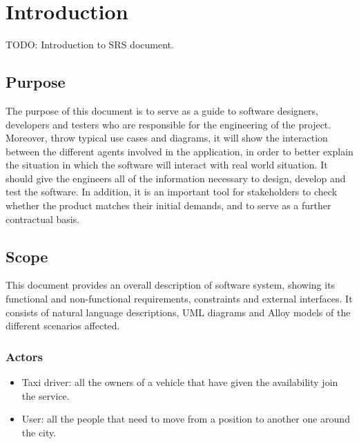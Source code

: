 \section{Introduction}      %
TODO: Introduction to \myTaxiService{} SRS document.
\subsection{Purpose}
The purpose of this document is to serve as a guide to software designers, developers and testers who are responsible for the engineering of the \myTaxiService{} project. Moreover, throw typical use cases and diagrams, it will show the interaction between the different agents involved in the application, in order to better explain the situation in which the software will interact with real world situation.
It should give the engineers all of the information necessary to design, develop and test the software. In addition, it is an important tool for \myTaxiService{} stakeholders to check whether the product matches their initial demands, and to serve as a further contractual basis.
\subsection{Scope}
This document provides an overall description of \myTaxiService{} software system, showing its functional and non-functional requirements, constraints and external interfaces.
It consists of natural language descriptions, UML diagrams and Alloy models of the different scenarios affected.
\subsubsection{Actors}
\begin{itemize}
	\item Taxi driver: all the owners of a vehicle that have given the availability join the service.
	\item User: all the people that need to move from a position to another one around the city.
\end{itemize}
